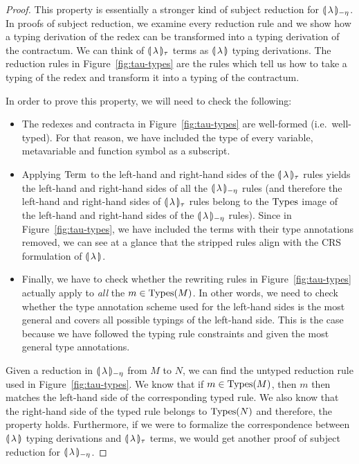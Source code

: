 \begin{proof}
  This property is essentially a stronger kind of subject reduction for
  ${\llparenthesis \, \lambda \, \rrparenthesis_{-\eta}}$. In proofs of subject reduction, we examine
  every reduction rule and we show how a typing derivation of the redex can
  be transformed into a typing derivation of the contractum. We can think
  of $\llparenthesis \, \lambda \, \rrparenthesis_\tau$ terms as $\llparenthesis \, \lambda \, \rrparenthesis$ typing
  derivations. The reduction rules in Figure~\ref{fig:tau-types} are the
  rules which tell us how to take a typing of the redex and transform it
  into a typing of the contractum.
  
  In order to prove this property, we will need to check the following:
  \begin{itemize}
  \item The redexes and contracta in Figure~\ref{fig:tau-types} are
    well-formed (i.e.\ well-typed). For that reason, we have included the
    type of every variable, metavariable and function symbol as a
    subscript.
  \item Applying $\operatorname{Term}$ to the left-hand and right-hand sides of the
    $\llparenthesis \, \lambda \, \rrparenthesis_\tau$ rules yields the left-hand and right-hand sides
    of all the ${\llparenthesis \, \lambda \, \rrparenthesis_{-\eta}}$ rules (and therefore the left-hand and right-hand
    sides of $\llparenthesis \, \lambda \, \rrparenthesis_\tau$ rules belong to the $\operatorname{Types}$ image of
    the left-hand and right-hand sides of the ${\llparenthesis \, \lambda \, \rrparenthesis_{-\eta}}$ rules). Since in
    Figure~\ref{fig:tau-types}, we have included the terms with their type
    annotations removed, we can see at a glance that the stripped rules
    align with the CRS formulation of $\llparenthesis \, \lambda \, \rrparenthesis$.
  \item Finally, we have to check whether the rewriting rules in
    Figure~\ref{fig:tau-types} actually apply to \emph{all} the
    $m \in \operatorname{Types}(M)$. In other words, we need to check whether the type
    annotation scheme used for the left-hand sides is the most general and
    covers all possible typings of the left-hand side. This is the case
    because we have followed the typing rule constraints and given the most
    general type annotations.
  \end{itemize}
  
  Given a reduction in ${\llparenthesis \, \lambda \, \rrparenthesis_{-\eta}}$ from $M$ to $N$, we can find the untyped
  reduction rule used in Figure~\ref{fig:tau-types}. We know that if
  $m \in \operatorname{Types}(M)$, then $m$ then matches the left-hand side of the
  corresponding typed rule. We also know that the right-hand side of the
  typed rule belongs to $\operatorname{Types}(N)$ and therefore, the property
  holds. Furthermore, if we were to formalize the correspondence between
  $\llparenthesis \, \lambda \, \rrparenthesis$ typing derivations and $\llparenthesis \, \lambda \, \rrparenthesis_\tau$ terms,
  we would get another proof of subject reduction for ${\llparenthesis \, \lambda \, \rrparenthesis_{-\eta}}$.
\end{proof}

